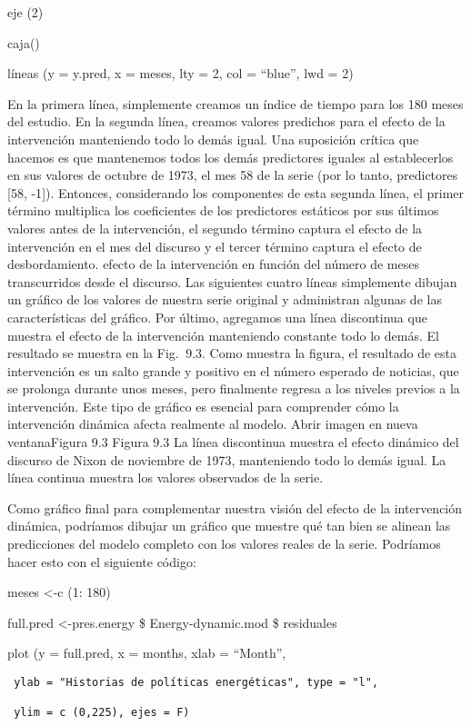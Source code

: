 \documentclass[
]{book}
\begin{document}
eje (2)

caja()

líneas (y = y.pred, x = meses, lty = 2, col = ``blue'', lwd = 2)

En la primera línea, simplemente creamos un índice de tiempo para los 180 meses del estudio. En la segunda línea, creamos valores predichos para el efecto de la intervención manteniendo todo lo demás igual. Una suposición crítica que hacemos es que mantenemos todos los demás predictores iguales al establecerlos en sus valores de octubre de 1973, el mes 58 de la serie (por lo tanto, predictores {[}58, -1{]}). Entonces, considerando los componentes de esta segunda línea, el primer término multiplica los coeficientes de los predictores estáticos por sus últimos valores antes de la intervención, el segundo término captura el efecto de la intervención en el mes del discurso y el tercer término captura el efecto de desbordamiento. efecto de la intervención en función del número de meses transcurridos desde el discurso. Las siguientes cuatro líneas simplemente dibujan un gráfico de los valores de nuestra serie original y administran algunas de las características del gráfico. Por último, agregamos una línea discontinua que muestra el efecto de la intervención manteniendo constante todo lo demás. El resultado se muestra en la Fig.  9.3. Como muestra la figura, el resultado de esta intervención es un salto grande y positivo en el número esperado de noticias, que se prolonga durante unos meses, pero finalmente regresa a los niveles previos a la intervención. Este tipo de gráfico es esencial para comprender cómo la intervención dinámica afecta realmente al modelo.
Abrir imagen en nueva ventanaFigura 9.3
Figura 9.3
La línea discontinua muestra el efecto dinámico del discurso de Nixon de noviembre de 1973, manteniendo todo lo demás igual. La línea continua muestra los valores observados de la serie.

Como gráfico final para complementar nuestra visión del efecto de la intervención dinámica, podríamos dibujar un gráfico que muestre qué tan bien se alinean las predicciones del modelo completo con los valores reales de la serie. Podríamos hacer esto con el siguiente código:

meses \textless-c (1: 180)

full.pred \textless-pres.energy \$ Energy-dynamic.mod \$ residuales

plot (y = full.pred, x = months, xlab = ``Month'',

\begin{verbatim}
 ylab = "Historias de políticas energéticas", type = "l",

 ylim = c (0,225), ejes = F)
\end{verbatim}
\end{document}

